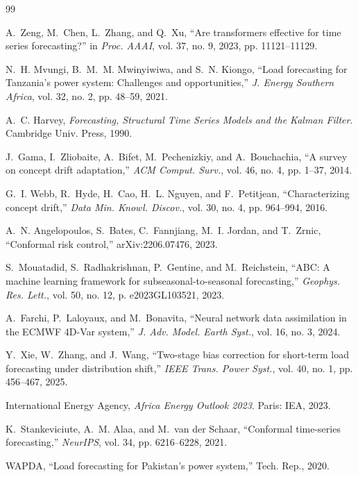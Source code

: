 \documentclass[10pt,twocolumn,letterpaper]{article}
\begin{document}
\begin{thebibliography}{99}

A.~Zeng, M.~Chen, L.~Zhang, and Q.~Xu, ``Are transformers effective for time series forecasting?'' in \emph{Proc. AAAI}, vol. 37, no. 9, 2023, pp. 11121--11129.

N.~H. Mvungi, B.~M.~M. Mwinyiwiwa, and S.~N. Kiongo, ``Load forecasting for Tanzania's power system: Challenges and opportunities,'' \emph{J. Energy Southern Africa}, vol. 32, no. 2, pp. 48--59, 2021.

A.~C. Harvey, \emph{Forecasting, Structural Time Series Models and the Kalman Filter}. Cambridge Univ. Press, 1990.

J.~Gama, I.~Zliobaite, A.~Bifet, M.~Pechenizkiy, and A.~Bouchachia, ``A survey on concept drift adaptation,'' \emph{ACM Comput. Surv.}, vol. 46, no. 4, pp. 1--37, 2014.

G.~I. Webb, R.~Hyde, H.~Cao, H.~L. Nguyen, and F.~Petitjean, ``Characterizing concept drift,'' \emph{Data Min. Knowl. Discov.}, vol. 30, no. 4, pp. 964--994, 2016.

A.~N. Angelopoulos, S.~Bates, C.~Fannjiang, M.~I. Jordan, and T.~Zrnic, ``Conformal risk control,'' arXiv:2206.07476, 2023.

S.~Mouatadid, S.~Radhakrishnan, P.~Gentine, and M.~Reichstein, ``ABC: A machine learning framework for subseasonal-to-seasonal forecasting,'' \emph{Geophys. Res. Lett.}, vol. 50, no. 12, p. e2023GL103521, 2023.

A.~Farchi, P.~Laloyaux, and M.~Bonavita, ``Neural network data assimilation in the ECMWF 4D-Var system,'' \emph{J. Adv. Model. Earth Syst.}, vol. 16, no. 3, 2024.

Y.~Xie, W.~Zhang, and J.~Wang, ``Two-stage bias correction for short-term load forecasting under distribution shift,'' \emph{IEEE Trans. Power Syst.}, vol. 40, no. 1, pp. 456--467, 2025.

International Energy Agency, \emph{Africa Energy Outlook 2023}. Paris: IEA, 2023.

K.~Stankeviciute, A.~M. Alaa, and M.~van der Schaar, ``Conformal time-series forecasting,'' \emph{NeurIPS}, vol. 34, pp. 6216--6228, 2021.

WAPDA, ``Load forecasting for Pakistan's power system,'' Tech. Rep., 2020.


\end{thebibliography}
\end{document}
